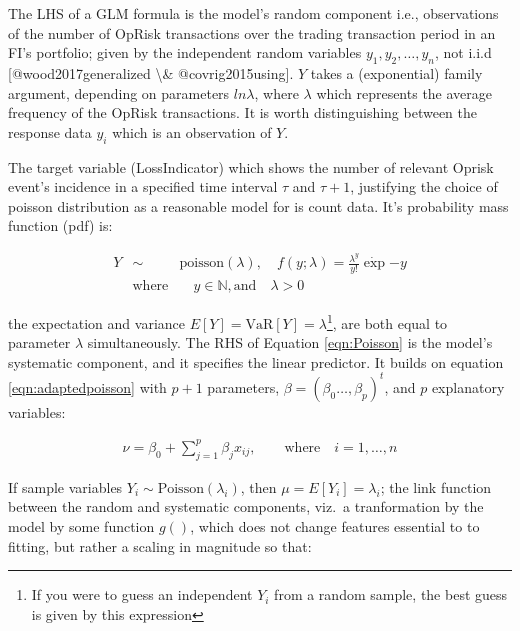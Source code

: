 \documentclass[]{article}
\let\rmarkdownfootnote\footnote%
\def\footnote{\protect\rmarkdownfootnote}
\begin{document}
The LHS of a GLM formula is the model's random component i.e.,
observations of the number of OpRisk transactions over the trading
transaction period in an FI's portfolio; given by the independent random
variables \(y_1, y_2,\ldots, y_n\), not i.i.d {[}@wood2017generalized
\textbackslash{}\& @covrig2015using{]}. \(Y\) takes a (exponential)
family argument, depending on parameters \(ln\lambda\), where
\(\lambda\) which represents the average frequency of the OpRisk
transactions. It is worth distinguishing between the response data
\(y_i\) which is an observation of \(Y\).\medskip

The target variable (LossIndicator) which shows the number of relevant
Oprisk event's incidence in a specified time interval \(\tau\) and
\(\tau+1\), justifying the choice of poisson distribution as a
reasonable model for is count data. It's probability mass function (pdf)
is:

\singlespacing

\begin{eqnarray}\label{eqn:Poisson}
Y &\sim& \mbox{poisson}(\lambda), \quad f(y;\lambda) = \frac{\lambda^y}{y!}\dot\exp{-y}\\
 &\mbox{where}& \quad y \in  \mathbb{N}, \mbox{and} \quad \lambda > 0 \nonumber
\end{eqnarray} \doublespacing

the expectation and variance
\(E[Y] = \mbox{VaR}[Y] = \lambda\)\footnote{If you were to guess an independent $Y_i$ from a random sample, the best guess is given by this expression},
are both equal to parameter \(\lambda\) simultaneously. The RHS of
Equation \ref{eqn:Poisson} is the model's systematic component, and it
specifies the linear predictor. It builds on equation
\ref{eqn:adaptedpoisson} with \(p+1\) parameters,
\(\beta = (\beta_0\ldots,\beta_p)^t\), and \(p\) explanatory variables:

\singlespacing

\begin{eqnarray}
\nu = \beta_0 + \sum_{j=1}^{p}\beta_jx_{ij}, \qquad \mbox{where} \quad i = 1,\ldots,n
\end{eqnarray} \doublespacing

If sample variables \(Y_i \sim \mbox{Poisson}(\lambda_i)\), then
\(\mu = E[Y_i] = \lambda_i\); the link function between the random and
systematic components, viz.~a tranformation by the model by some
function \(g()\), which does not change features essential to to
fitting, but rather a scaling in magnitude so that:
\end{document}
